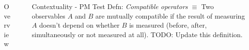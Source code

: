 \documentclass[final,hyperref={pdfpagelabels=false}]{beamer}
\begin{document}
\begin{frame}[t]
\begin{columns}[c]
\begin{column}{.32\textwidth}
\begin{block}{Overview}


      \end{block}

\end{column}
\begin{column}{.01\textwidth}\end{column} %
\begin{column}{.32\textwidth} %



  \begin{block}{Contextuality - PM Test}
    Defn: \emph{Compatible operators} $\equiv$ Two observables $A$ and $B$ are mutually compatible if the result of measuring $A$ doesn't depend on whether $B$ is measured (before, after, simultaneously or not measured at all). TODO: Update this definition.


\end{block}
\end{column}
\end{columns}
\end{frame}
\end{document}
